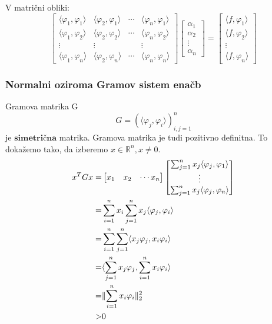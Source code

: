 \documentclass[a4paper,12pt]{article}
\DeclarePairedDelimiter\norm{\lVert}{\rVert}
\newcommand{\innerproduct}[2]{\langle #1, #2 \rangle}
\theoremstyle{definition}
\theoremstyle{remark}
\newcommand{\R}{\mathbb{R}}
\begin{document}
V matrični obliki:
\begin{equation*}
    \begin{bmatrix}
        \innerproduct{\varphi_1}{\varphi_1} & \innerproduct{\varphi_2}{\varphi_1} & \cdots & \innerproduct{\varphi_n}{\varphi_1} \\
        \innerproduct{\varphi_1}{\varphi_2} & \innerproduct{\varphi_2}{\varphi_2} & \cdots & \innerproduct{\varphi_n}{\varphi_2} \\
        \vdots & \vdots & & \vdots \\
        \innerproduct{\varphi_1}{\varphi_n} & \innerproduct{\varphi_2}{\varphi_n} & \cdots & \innerproduct{\varphi_n}{\varphi_n}
    \end{bmatrix}
    \begin{bmatrix}
        \alpha_1 \\
        \alpha_2 \\
        \vdots \\
        \alpha_n
    \end{bmatrix}
    =
    \begin{bmatrix}
        \innerproduct{f}{\varphi_1}\\
        \innerproduct{f}{\varphi_2}\\
        \vdots \\
        \innerproduct{f}{\varphi_n}
    \end{bmatrix}
\end{equation*}

\subsubsection{Normalni oziroma Gramov sistem enačb}
Gramova matrika G
\begin{equation*}
    G = (\innerproduct{\varphi_j}{\varphi_i})_{i, j = 1}^n
\end{equation*}
je $\textbf{simetrična}$ matrika. Gramova matrika je tudi pozitivno definitna. To dokažemo tako, da izberemo $x \in \R^n, x \neq 0$.
\begin{align}
    x^T G x =&
    \begin{bmatrix}
        x_1 & x_2 & \cdots x_n
    \end{bmatrix}
    \begin{bmatrix}
        \sum_{j = 1}^{n} x_j \innerproduct{\varphi_j}{\varphi_1} \\
        \vdots \\
        \sum_{j = 1}^{n} x_j \innerproduct{\varphi_j}{\varphi_n}
    \end{bmatrix} \nonumber \\
    =& \sum_{i = 1}^{n} x_i \sum_{j = 1}^{n} x_j \innerproduct{\varphi_j}{\varphi_i} \nonumber \\
    =& \sum_{i = 1}^{n} \sum_{j = 1}^{n} \innerproduct{x_j \varphi_j}{x_i \varphi_i} \nonumber \\
    =& \innerproduct{\sum_{j = 1}^{n} x_j \varphi_j}{\sum_{i = 1}^{n} x_i \varphi_i} \nonumber\\
    =& \norm{\sum_{i = 1}^{n} x_i \varphi_i}_2^2 \nonumber \\
    >& 0 \label{eq:grammNeenacaj}
\end{align}
\end{document}
